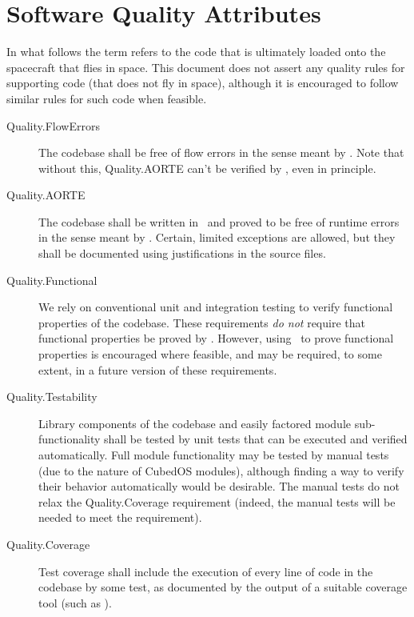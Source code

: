 
\section{Software Quality Attributes}

In what follows the term  refers to the code that is
ultimately loaded onto the spacecraft that flies in space. This
document does not assert any quality rules for supporting code (that
does not fly in space), although it is encouraged to follow similar
rules for such code when feasible.

\begin{description}
\item[Quality.FlowErrors] The codebase shall be free of flow errors in
  the sense meant by \SPARK. Note that without this, Quality.AORTE
  can't be verified by \SPARK, even in principle.

\item[Quality.AORTE] The codebase shall be written in \SPARK\ and
  proved to be free of runtime errors in the sense meant by
  \SPARK. Certain, limited exceptions are allowed, but they shall be
  documented using justifications in the source files.

\item[Quality.Functional] We rely on conventional unit and integration
  testing to verify functional properties of the codebase. These
  requirements \emph{do not} require that functional properties be
  proved by \SPARK. However, using \SPARK\ to prove functional
  properties is encouraged where feasible, and may be required, to
  some extent, in a future version of these requirements.

\item[Quality.Testability] Library components of the codebase and
  easily factored module sub-functionality shall be tested by unit
  tests that can be executed and verified automatically. Full module
  functionality may be tested by manual tests (due to the nature of
  CubedOS modules), although finding a way to verify their behavior
  automatically would be desirable. The manual tests do not relax the
  Quality.Coverage requirement (indeed, the manual tests will be
  needed to meet the requirement).

\item[Quality.Coverage] Test coverage shall include the execution of
  every line of code in the codebase by some test, as documented by
  the output of a suitable coverage tool (such as ).


\end{description}
